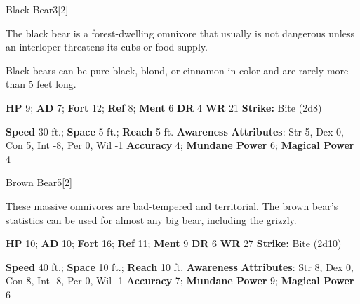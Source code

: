   \begin{monsection}{Black Bear}{3}[2]
    \vspace{-1em}\vspace{-1em}
    \vspace{0em}

    
      The black bear is a forest-dwelling omnivore that usually is not dangerous unless an interloper threatens its cubs or food supply.

      Black bears can be pure black, blond, or cinnamon in color and are rarely more than 5 feet long.
    

    \begin{spellcontent}
      \begin{spelltargetinginfo}
        \pari \textbf{HP} 9;
          \textbf{AD} 7;
          \textbf{Fort} 12;
          \textbf{Ref} 8;
          \textbf{Ment} 6
        \pari \textbf{DR} 4
        \pari \textbf{WR} 21
        \pari \textbf{Strike:}
            Bite  (2d8)
      \end{spelltargetinginfo}
    \end{spellcontent}
    \begin{monsterfooter}
      \pari \textbf{Speed} 30 ft.;
        \textbf{Space} 5 ft.;
        \textbf{Reach} 5 ft.
      \pari \textbf{Awareness} 
      \pari \textbf{Attributes}:
        Str 5, Dex 0,
        Con 5, Int -8,
        Per 0, Wil -1
      \pari \textbf{Accuracy} 4;
        \textbf{Mundane Power} 6;
      \textbf{Magical Power} 4
    \end{monsterfooter}
  \end{monsection}
  
  
  \begin{monsection}{Brown Bear}{5}[2]
    \vspace{-1em}\vspace{-1em}
    \vspace{0em}

    
      These massive omnivores are bad-tempered and territorial.
      The brown bear's statistics can be used for almost any big bear, including the grizzly.
    

    \begin{spellcontent}
      \begin{spelltargetinginfo}
        \pari \textbf{HP} 10;
          \textbf{AD} 10;
          \textbf{Fort} 16;
          \textbf{Ref} 11;
          \textbf{Ment} 9
        \pari \textbf{DR} 6
        \pari \textbf{WR} 27
        \pari \textbf{Strike:}
            Bite  (2d10)
      \end{spelltargetinginfo}
    \end{spellcontent}
    \begin{monsterfooter}
      \pari \textbf{Speed} 40 ft.;
        \textbf{Space} 10 ft.;
        \textbf{Reach} 10 ft.
      \pari \textbf{Awareness} 
      \pari \textbf{Attributes}:
        Str 8, Dex 0,
        Con 8, Int -8,
        Per 0, Wil -1
      \pari \textbf{Accuracy} 7;
        \textbf{Mundane Power} 9;
      \textbf{Magical Power} 6
    \end{monsterfooter}
  \end{monsection}
  
